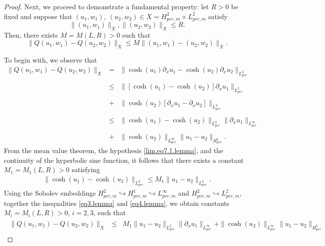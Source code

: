 \documentclass[12pt,reqno,a4paper]{amsart} %
\numberwithin{equation}{section}
\numberwithin{figure}{section}
\begin{document}
\begin{proof}
	Next, we proceed to demonstrate a fundamental property: let $R>0$ be fixed and suppose that 
	$(u_1, w_1), \  (u_2, w_2)\in X=H_{per,m}^2\times L_{per,m}^2$ satisfy 
	\begin{equation}\label{lim.eq7.1.lemma}  
		\| (u_1, w_1)\|_{X}, \| (u_2, w_2)\|_{X}\leq R.
	\end{equation} Then, there exists $M=M(L,R)>0$ such that
	\begin{equation}\label{eq7.1.lemma}  
		\|Q(u_1, w_1)-Q(u_2, w_2)\|_X\leq  M \|(u_1,w_1)-(u_2, w_2)\|_X.
	\end{equation}
	
	To begin with, we observe that 
	\begin{equation}\label{eq3.lemma}\begin{array}{llll}
			\|Q(u_1,w_1)-Q(u_2, w_2)\|_X &= & \| \cosh(u_1)\partial_xu_1-\cosh(u_2)\partial_xu_2 \|_{L_{per}^2}
			\\\\ &\leq & \| [\cosh(u_1)- \cosh(u_2)]\partial_xu_1\|_{L_{per}^2}\\\\
			&+&\|\cosh(u_2)[\partial_xu_1-\partial_xu_2 ] \|_{L_{per}^2}\\\\ &\leq & \| \cosh(u_1)- \cosh(u_2)\|_{L_{per}^2}\|\partial_xu_1\|_{L_{per}^\infty}\\\\ &+&\|\cosh(u_2)\|_{L_{per}^\infty}\|u_1-u_2  \|_{H_{per}^1}. 
	\end{array}\end{equation}
	From the mean value theorem, the hypothesis \eqref{lim.eq7.1.lemma}, and the continuity of the hyperbolic sine function, it follows that there exists a constant $M_1=M_1(L,R)>0$ satisfying 
	\begin{align}\label{eq4.lemma}
		\| \cosh(u_1)- \cosh(u_2)\|_{L_{per}^2}\leq M_1 \|u_1-u_2  \|_{L_{per}^2}.
	\end{align}
	Using the Sobolev embeddings $\displaystyle H_{per,m}^2 \hookrightarrow H_{per,m}^1\hookrightarrow L_{per,m}^\infty$ and $\displaystyle H_{per,m}^2\hookrightarrow L_{per,m}^2$, together the inequalities \eqref{eq3.lemma} and \eqref{eq4.lemma}, we obtain constants  $M_i=M_i(L,R)>0$, $i=2,3$, such that 
	\begin{align}\begin{array}{llll}\label{eq5.lemma}
		\|Q(u_1,w_1)-Q(u_2, w_2)\|_X &\leq &  M_1 \|u_1-u_2  \|_{L_{per}^2}\|\partial_xu_1\|_{L_{per}^\infty} +\|\cosh(u_2)\|_{L_{per}^\infty}\|u_1-u_2  \|_{H_{per}^1} %

\end{array}
\end{align}
\end{proof}
\end{document}
